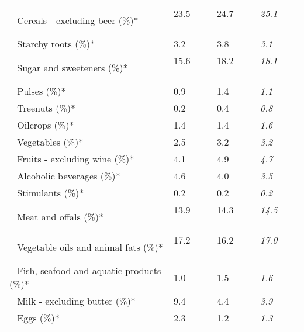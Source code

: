 \begin{tabular}{L{3.9cm} R{1cm} R{1cm} R{1cm}}
	 ~ Cereals - excluding beer (\%)* & 23.5 ~ \ \ & 24.7 ~ \ \ & \textit{25.1} ~ \ \ \\ 
	 ~ Starchy roots (\%)* & 3.2 ~ \ \ & 3.8 ~ \ \ & \textit{3.1} ~ \ \ \\ 
	 ~ Sugar and sweeteners (\%)* & 15.6 ~ \ \ & 18.2 ~ \ \ & \textit{18.1} ~ \ \ \\ 
	 ~ Pulses (\%)* & 0.9 ~ \ \ & 1.4 ~ \ \ & \textit{1.1} ~ \ \ \\ 
	 ~ Treenuts (\%)* & 0.2 ~ \ \ & 0.4 ~ \ \ & \textit{0.8} ~ \ \ \\ 
	 ~ Oilcrops (\%)* & 1.4 ~ \ \ & 1.4 ~ \ \ & \textit{1.6} ~ \ \ \\ 
	 ~ Vegetables (\%)* & 2.5 ~ \ \ & 3.2 ~ \ \ & \textit{3.2} ~ \ \ \\ 
	 ~ Fruits - excluding wine (\%)* & 4.1 ~ \ \ & 4.9 ~ \ \ & \textit{4.7} ~ \ \ \\ 
	 ~ Alcoholic beverages (\%)* & 4.6 ~ \ \ & 4.0 ~ \ \ & \textit{3.5} ~ \ \ \\ 
	 ~ Stimulants (\%)* & 0.2 ~ \ \ & 0.2 ~ \ \ & \textit{0.2} ~ \ \ \\ 
	 ~ Meat and offals (\%)* & 13.9 ~ \ \ & 14.3 ~ \ \ & \textit{14.5} ~ \ \ \\ 
	 ~ Vegetable oils and animal fats (\%)* & 17.2 ~ \ \ & 16.2 ~ \ \ & \textit{17.0} ~ \ \ \\ 
	 ~ Fish, seafood and aquatic products (\%)* & 1.0 ~ \ \ & 1.5 ~ \ \ & \textit{1.6} ~ \ \ \\ 
	 ~ Milk - excluding butter (\%)* & 9.4 ~ \ \ & 4.4 ~ \ \ & \textit{3.9} ~ \ \ \\ 
	 ~ Eggs (\%)* & 2.3 ~ \ \ & 1.2 ~ \ \ & \textit{1.3} ~ \ \ \\ 
       \toprule
      \end{tabular}
      \clearpage
{}
